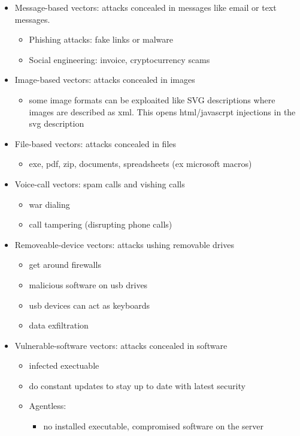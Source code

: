 \documentclass[11pt]{article}
\begin{document}
\begin{itemize}
\item Message-based vectors: attacks concealed in messages like email or text messages.
\begin{itemize}
\item Phishing attacks: fake links or malware
\item Social engineering: invoice, cryptocurrency scams
\end{itemize}

\item Image-based vectors: attacks concealed in images
\begin{itemize}
\item some image formats can be exploaited like SVG descriptions where images are described as xml. This opens html/javascrpt injections in the svg description
\end{itemize}

\item File-based vectors: attacks concealed in files
\begin{itemize}
\item exe, pdf, zip, documents, spreadsheets (ex microsoft macros)
\end{itemize}

\item Voice-call vectors: spam calls and vishing calls
\begin{itemize}
\item war dialing
\item call tampering (disrupting phone calls)
\end{itemize}

\item Removeable-device vectors: attacks ushing removable drives
\begin{itemize}
\item get around firewalls
\item malicious software on usb drives
\item usb devices can act as keyboards
\item data exfiltration
\end{itemize}

\item Vulnerable-software vectors: attacks concealed in software
\begin{itemize}
\item infected exectuable
\item do constant updates to stay up to date with latest security
\item Agentless:
\begin{itemize}
\item no installed executable, compromised software on the server
\end{itemize}
\end{itemize}


\end{itemize}
\end{document}
